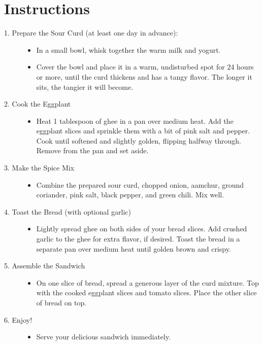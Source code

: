 \documentclass{article} %
\begin{document}
\section*{Instructions}

\begin{description}
\item[1. Prepare the Sour Curd (at least one day in advance):]\hfill
\begin{itemize}
   \item In a small bowl, whisk together the warm milk and yogurt.
   \item Cover the bowl and place it in a warm, undisturbed spot for 24 hours or more, until the curd thickens and has a tangy flavor. The longer it sits, the tangier it will become. 
\end{itemize}

\item[2. Cook the Eggplant]\hfill
\begin{itemize}
    \item Heat 1 tablespoon of ghee in a pan over medium heat. Add the eggplant slices and sprinkle them with a bit of pink salt and pepper. Cook until softened and slightly golden, flipping halfway through. Remove from the pan and set aside.
\end{itemize}


\item[3. Make the Spice Mix]\hfill
\begin{itemize}
    \item Combine the prepared sour curd, chopped onion, aamchur, ground coriander, pink salt, black pepper, and green chili. Mix well.
\end{itemize}


\item[4. Toast the Bread (with optional garlic)]\hfill
\begin{itemize}
    \item Lightly spread ghee on both sides of your bread slices. Add crushed garlic to the ghee for extra flavor, if desired. Toast the bread in a separate pan over medium heat until golden brown and crispy.
\end{itemize}


\item[5. Assemble the Sandwich]\hfill
\begin{itemize}
\item On one slice of bread, spread a generous layer of the curd mixture. Top with the cooked eggplant slices and tomato slices. Place the other slice of bread on top.
\end{itemize}
\item[6. Enjoy!]\hfill
\begin{itemize}
    \item Serve your delicious sandwich immediately.
\end{itemize}
\end{description}
\end{document}

